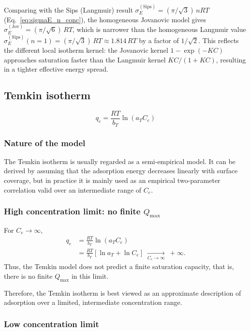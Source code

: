 \documentclass[12pt]{article}
\begin{document}
	Comparing with the Sips (Langmuir) result
	$\sigma_E^{\mathrm{(Sips)}} = (\pi/\sqrt{3})\,nRT$
	(Eq.~\eqref{eq:sigmaE_n_conc}), the homogeneous Jovanovic model
	gives $\sigma_E^{\mathrm{(Jov)}} = (\pi/\sqrt{6})\,RT$, which is
	narrower than the homogeneous Langmuir value
	$\sigma_E^{\mathrm{(Sips)}}(n=1) = (\pi/\sqrt{3})\,RT
	\approx 1.814\,RT$ by a factor of $1/\sqrt{2}$. This reflects the
	different local isotherm kernel: the Jovanovic kernel
	$1 - \exp(-KC)$ approaches saturation faster than the Langmuir
	kernel $KC/(1+KC)$, resulting in a tighter effective energy spread.

	\subsection{Temkin isotherm}
	\[
	q_e = \frac{RT}{b_T} \ln(a_T C_e)
	\]
	
	\subsubsection{Nature of the model}
	
	The Temkin isotherm is usually regarded as a semi-empirical model. It can be
	derived by assuming that the adsorption energy decreases linearly with surface
	coverage, but in practice it is mainly used as an empirical two-parameter
	correlation valid over an intermediate range of $C_e$.
	
	\subsubsection{High concentration limit: no finite $Q_{\max}$}
	
	For $C_e \to \infty$,
	\begin{align}
		q_e 
		&= \frac{RT}{b_T} \ln(a_T C_e) \nonumber \\
		&= \frac{RT}{b_T} \left[\ln a_T + \ln C_e\right]
		\;\xrightarrow[C_e \to \infty]{}\; +\infty.
	\end{align}
	Thus, the Temkin model does not predict a finite saturation capacity, that is, there is no finite $Q_{\max}$ in this limit.
	
	Therefore, the Temkin isotherm is best viewed as an approximate description of adsorption over a limited, intermediate concentration range.
	
	\subsubsection{Low concentration limit}
	
\end{document}

